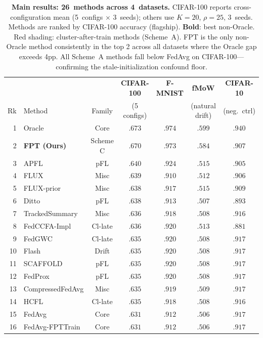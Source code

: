 \documentclass[11pt]{article}
\begin{document}
\begin{table}[t]
\centering
\caption{\textbf{Main results: 26~methods across 4~datasets.} CIFAR-100 reports cross-configuration mean (5~configs $\times$ 3~seeds); others use $K{=}20$, $\rho{=}25$, 3~seeds. Methods are ranked by CIFAR-100 accuracy (flagship). \textbf{Bold}: best non-Oracle. \colorbox{red!8}{Red shading}: cluster-after-train methods (Scheme~A). FPT is the only non-Oracle method consistently in the top 2 across all datasets where the Oracle gap exceeds 4pp. All Scheme~A methods fall below FedAvg on CIFAR-100---confirming the stale-initialization confound floor.}
\label{tab:main}
\small
\setlength{\tabcolsep}{3pt}
\begin{tabular}{rlccccc}
\toprule
& & & \textbf{CIFAR-100} & \textbf{F-MNIST} & \textbf{fMoW} & \textbf{CIFAR-10} \\
Rk & Method & Family & (5 configs) & & (natural drift) & (neg.\ ctrl) \\
\midrule
1  & Oracle & Core & $.673$ & $.974$ & $.599$ & $.940$ \\
2  & \textbf{FPT (Ours)} & Scheme C & $\mathbf{.670}$ & $\mathbf{.973}$ & $\mathbf{.584}$ & $.907$ \\
\midrule
3  & APFL & pFL & $.640$ & $.924$ & $.515$ & $.905$ \\
4  & FLUX & Misc & $.639$ & $.910$ & $.512$ & $.906$ \\
5  & FLUX-prior & Misc & $.638$ & $.917$ & $.515$ & $.909$ \\
6  & Ditto & pFL & $.638$ & $.913$ & $.507$ & $.893$ \\
7  & TrackedSummary & Misc & $.636$ & $.918$ & $.508$ & $.916$ \\
8  & FedCCFA-Impl & Cl-late & $.636$ & $.920$ & $.513$ & $.881$ \\
9  & FedGWC & Cl-late & $.635$ & $.920$ & $.508$ & $.917$ \\
10 & Flash & Drift & $.635$ & $.920$ & $.508$ & $.917$ \\
11 & SCAFFOLD & pFL & $.635$ & $.920$ & $.508$ & $.917$ \\
12 & FedProx & pFL & $.635$ & $.920$ & $.508$ & $.917$ \\
13 & CompressedFedAvg & Misc & $.635$ & $.919$ & $.509$ & $.917$ \\
14 & HCFL & Cl-late & $.635$ & $.918$ & $.508$ & $.916$ \\
15 & FedAvg & Core & $.631$ & $.912$ & $.506$ & $.917$ \\
16 & FedAvg-FPTTrain & Core & $.631$ & $.912$ & $.506$ & $.917$ \\

\end{tabular}
\end{table}
\end{document}

